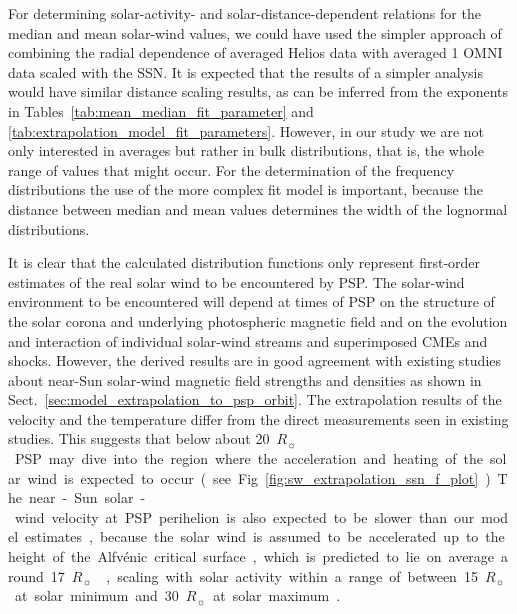 \documentclass[]{aa}
\newcommand{\Rs}{$R_\sun{}$}
\begin{document}
        For determining solar-activity- and solar-distance-dependent relations for the median and mean solar-wind values, we could have used the simpler approach of combining the radial dependence of averaged Helios data with averaged \SI{1}{\au} OMNI data scaled with the SSN. It is expected that the results of a simpler analysis would have similar distance scaling results, as can be inferred from the exponents in Tables~\ref{tab:mean_median_fit_parameter} and \ref{tab:extrapolation_model_fit_parameters}. However, in our study we are not only interested in averages but rather in bulk distributions, that is, the whole range of values that might occur. For the determination of the frequency distributions the use of the more complex fit model is important, because the distance between median and mean values determines the width of the lognormal distributions.

        It is clear that the calculated distribution functions only represent first-order estimates of the real solar wind to be encountered by PSP. The solar-wind environment to be encountered will depend at times of PSP on the structure of the solar corona and underlying photospheric magnetic field and on the evolution and interaction of individual solar-wind streams and superimposed CMEs and shocks. However, the derived results are in good agreement with existing studies about near-Sun solar-wind magnetic field strengths and densities as shown in Sect.~\ref{sec:model_extrapolation_to_psp_orbit}. The extrapolation results of the velocity and the temperature differ from the direct measurements seen in existing studies. This suggests that below about \SI{20}{\Rs} PSP may dive into the region where the acceleration and heating of the solar wind is expected to occur (see Fig.~\ref{fig:sw_extrapolation_ssn_f_plot}). The near-Sun solar-wind velocity at PSP perihelion is also expected to be slower than our model estimates, because the solar wind is assumed to be accelerated up to the height of the Alfvénic critical surface, which is predicted to lie on average around \SI{17}{\Rs} \citep[e.g.,][]{Sittler1999,Exarhos2000}, scaling with solar activity within a range of between \SI{15}{\Rs} at solar minimum and \SI{30}{\Rs} at solar maximum \citep{Katsikas2010,Goelzer2014}.
\end{document}
